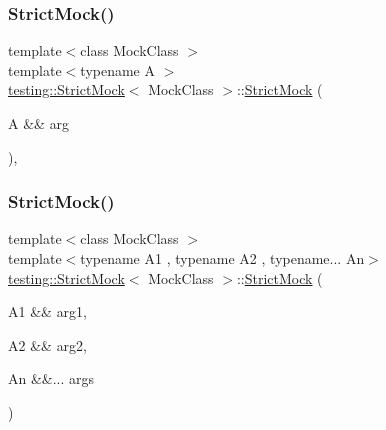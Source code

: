 \subsubsection{\texorpdfstring{StrictMock()}{StrictMock()}\hspace{0.1cm}{\footnotesize\ttfamily [5/17]}}
{\footnotesize\ttfamily template$<$class Mock\+Class $>$ \\
template$<$typename A $>$ \\
\mbox{\hyperlink{classtesting_1_1_strict_mock}{testing\+::\+Strict\+Mock}}$<$ Mock\+Class $>$\+::\mbox{\hyperlink{classtesting_1_1_strict_mock}{Strict\+Mock}} (\begin{DoxyParamCaption}\item[{A \&\&}]{arg }\end{DoxyParamCaption})\hspace{0.3cm}{\ttfamily [inline]}, {\ttfamily [explicit]}}

\mbox{\label{classtesting_1_1_strict_mock_aec319a31bdd194d1ff9596a810cb9067}} 
\subsubsection{\texorpdfstring{StrictMock()}{StrictMock()}\hspace{0.1cm}{\footnotesize\ttfamily [6/17]}}
{\footnotesize\ttfamily template$<$class Mock\+Class $>$ \\
template$<$typename A1 , typename A2 , typename... An$>$ \\
\mbox{\hyperlink{classtesting_1_1_strict_mock}{testing\+::\+Strict\+Mock}}$<$ Mock\+Class $>$\+::\mbox{\hyperlink{classtesting_1_1_strict_mock}{Strict\+Mock}} (\begin{DoxyParamCaption}\item[{A1 \&\&}]{arg1,  }\item[{A2 \&\&}]{arg2,  }\item[{An \&\&...}]{args }\end{DoxyParamCaption})\hspace{0.3cm}{\ttfamily [inline]}}

\mbox{\label{classtesting_1_1_strict_mock_a1c7ec10ea86747bb23037380a7353bd1}} 
